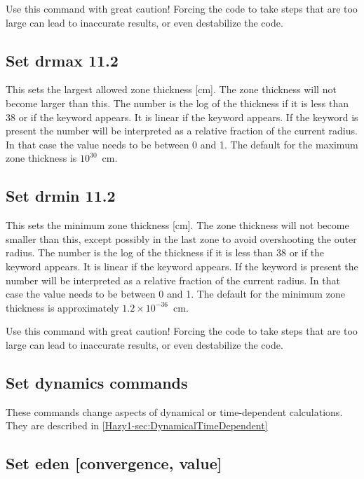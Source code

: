 Use this command with great caution! Forcing the code to take steps that are too large
can lead to inaccurate results, or even destabilize the code.

\subsection{Set drmax 11.2}

This sets the largest allowed zone thickness [cm].
The zone thickness
will not become larger than this.
The number is the log of the thickness
if it is less than 38 or if the keyword  appears.
It is linear if the keyword
 appears. If the keyword  is present the
number will be interpreted as a relative fraction of the current radius. In that
case the value needs to be between 0 and 1.
The default for the maximum zone thickness is $10^{30}$~cm.

\subsection{Set drmin 11.2}

This sets the minimum zone thickness [cm]. The zone thickness will not become
smaller than this, except possibly in the last zone to avoid overshooting the
outer radius. The number is the log of the thickness if it is less than 38 or
if the keyword  appears. It is linear if the keyword
 appears. If the keyword  is present the
number will be interpreted as a relative fraction of the current radius. In that
case the value needs to be between 0 and 1.
The default for the minimum zone thickness is approximately $1.2 \times 10^{-36}$~cm.

Use this command with great caution! Forcing the code to take steps that are too large
can lead to inaccurate results, or even destabilize the code.

\subsection{Set dynamics commands}

These commands change aspects of dynamical or time-dependent calculations.
They are described in 
\ref{Hazy1-sec:DynamicalTimeDependent}

\subsection{Set eden [convergence, value]}

